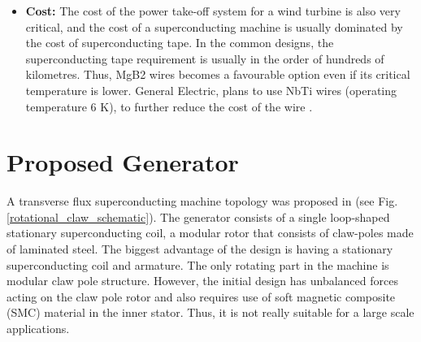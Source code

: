 \documentclass[12pt]{IET02}
\begin{document}
\begin{itemize}
  \item \textbf{Cost:} The cost of the power take-off system for a wind turbine is also very critical, and the cost of a superconducting machine is usually dominated by the cost of superconducting tape. In the common designs, the superconducting tape requirement is usually in the order of hundreds of kilometres. Thus, MgB2 wires becomes a favourable option even if its critical temperature is lower. General Electric, plans to use NbTi wires (operating temperature 6 K), to further reduce the cost of the wire \cite{fair2012}.


 \end{itemize}

\section{Proposed Generator} %
\label{sec:proposed_generator}

A transverse flux superconducting machine topology was proposed in \cite{Keysan2011e,Keysan2012a} (see Fig. \ref{rotational_claw_schematic}). The generator consists of a single loop-shaped stationary superconducting coil, a modular rotor that consists of claw-poles made of laminated steel. The biggest advantage of the design is having a stationary superconducting coil and armature. The only rotating part in the machine is modular claw pole structure. However, the initial design has unbalanced forces acting on the claw pole rotor and also requires use of soft magnetic composite (SMC) material in the inner stator. Thus, it is not really suitable for a large scale applications.
\end{document}
